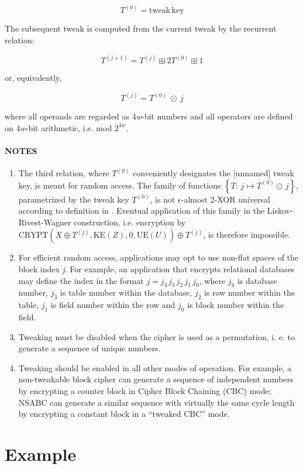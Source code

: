 \documentclass[a4paper,oneside,english]{amsart}
\numberwithin{equation}{section}
\numberwithin{figure}{section}
\begin{document}
\[
T^{(0)}=\mathrm{tweak\, key}
\]


The subsequent tweak is computed from the current tweak by the recurrent
relation:

\[
T^{(j+1)}=T^{(j)}\boxplus2T^{(0)}\boxplus1
\]


or, equivalently,

\[
T^{(j)}=T^{(0)}\:\odot\: j
\]
 

where all operands are regarded as 4\emph{w}-bit numbers and all operators
are defined on 4\emph{w}-bit arithmetic, i.e. mod $2^{4w}$.


\paragraph*{NOTES}
\begin{enumerate}
\item The third relation, where $T^{(0)}$ conveniently designates the {[}unnamed{]}
tweak key, is meant for random access. The family of functions $\left\{ T:\, j\mapsto T^{(0)}\odot\, j\right\} $,
parametrized by the tweak key $T^{(0)}$, is not $\epsilon$-almost
2-XOR universal according to definition in \cite{LRW02}. Eventual
application of this family in the Liskov-Rivest-Wagner construction,
i.e. encryption by $\mathrm{CRYPT}(X\oplus T^{(j)},\mathrm{KE}(Z),0,\mathrm{UE}(U))\oplus T^{(j)}$,
is therefore impossible.
\item For efficient random access, applications may opt to use non-flat
spaces of the block index \emph{j}. For example, an application that
encrypts relational databases may define the index in the format $j=j_{4\,}j_{3}\, j_{2}\, j_{1}\, j_{0}$,
where $j_{4}$ is database number, $j_{3}$ is table number within
the database, $j_{2}$ is row number within the table, $j_{1}$ is
field number within the row and $j_{0}$ is block number within the
field.
\item Tweaking must be disabled when the cipher is used as a permutation,
i. e. to generate a sequence of unique numbers.
\item Tweaking should be enabled in all other modes of operation. For example,
a non-tweakable block cipher can generate a sequence of independent
numbers by encrypting a counter block in Cipher Block Chaining (CBC)
mode; NSABC can generate a similar sequence with virtually the same
cycle length by encrypting a constant block in a {}``tweaked CBC''
mode.
\end{enumerate}

\section{Example}
\end{document}
